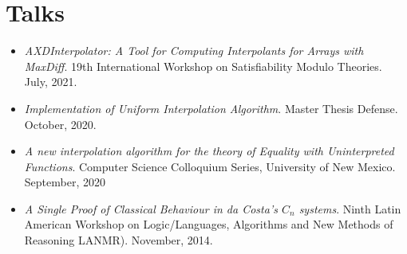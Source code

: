 \section{Talks}

\begin{itemize}

  \item \emph{AXDInterpolator: A Tool for Computing Interpolants for Arrays with MaxDiff}. 19th International Workshop  on Satisfiability Modulo Theories. July, 2021.
  \item \emph{Implementation of Uniform Interpolation Algorithm}. Master Thesis Defense. October, 2020.
  \item \emph{A new interpolation algorithm for the theory of Equality with Uninterpreted Functions}. Computer Science Colloquium Series, University of New Mexico. September, 2020
  \item \emph{A Single Proof of Classical Behaviour in da Costa's $C_n$ systems}. Ninth Latin American Workshop on 
    Logic/Languages, Algorithms and New 
    Methods of Reasoning LANMR). November, 2014.
\end{itemize}
